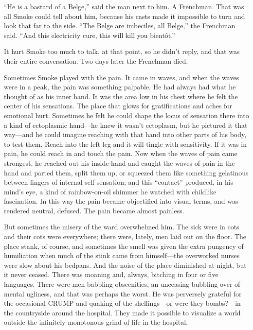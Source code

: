``He is a bastard of a Belge,'' said the man next to him. A Frenchman. That was all Smoke could tell about him, because his casts made it impossible to turn and look that far to the side. ``The Belge are imbeciles, all Belge,'' the Frenchman said. ``And this electricity cure, this will kill you bientôt.''

It hurt Smoke too much to talk, at that point, so he didn't reply, and that was their entire conversation. Two days later the Frenchman died.

Sometimes Smoke played with the pain. It came in waves, and when the waves were in a peak, the pain was something palpable. He had always had what he thought of as his inner hand. It was the area low in his chest where he felt the center of his sensations. The place that glows for gratifications and aches for emotional hurt. Sometimes he felt he could shape the locus of sensation there into a kind of ectoplasmic hand—he knew it wasn't ectoplasm, but he pictured it that way—and he could imagine reaching with that hand into other parts of his body, to test them. Reach into the left leg and it will tingle with sensitivity. If it was in pain, he could reach in and touch the pain. Now when the waves of pain came strongest, he reached out his inside hand and caught the waves of pain in the hand and parted them, split them up, or squeezed them like something gelatinous between fingers of internal self-sensation; and this ``contact'' produced, in his mind's eye, a kind of rainbow-on-oil shimmer he watched with childlike fascination. In this way the pain became objectified into visual terms, and was rendered neutral, defused. The pain became almost painless.

But sometimes the misery of the ward overwhelmed him. The sick were in cots and their cots were everywhere; there were, lately, men laid out on the floor. The place stank, of course, and sometimes the smell was given the extra pungency of humiliation when much of the stink came from himself—the overworked nurses were slow about his bedpans. And the noise of the place diminished at night, but it never ceased. There was moaning and, always, bitching in four or five languages. There were men babbling obscenities, an unceasing bubbling over of mental ugliness, and that was perhaps the worst. He was perversely grateful for the occasional CRUMP and quaking of the shellings—or were they bombs?—in the countryside around the hospital. They made it possible to visualize a world outside the infinitely monotonous grind of life in the hospital.

